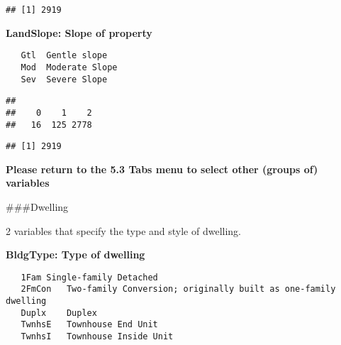 \documentclass[]{article}
\newenvironment{Shaded}{\begin{snugshade}}{\end{snugshade}}
\newcommand{\CommentTok}[1]{\textcolor[rgb]{0.56,0.35,0.01}{\textit{#1}}}
\newcommand{\DecValTok}[1]{\textcolor[rgb]{0.00,0.00,0.81}{#1}}
\newcommand{\KeywordTok}[1]{\textcolor[rgb]{0.13,0.29,0.53}{\textbf{#1}}}
\newcommand{\NormalTok}[1]{#1}
\newcommand{\OperatorTok}[1]{\textcolor[rgb]{0.81,0.36,0.00}{\textbf{#1}}}
\newcommand{\StringTok}[1]{\textcolor[rgb]{0.31,0.60,0.02}{#1}}
\begin{document}
\begin{verbatim}
## [1] 2919
\end{verbatim}

\textbf{LandSlope: Slope of property}

\begin{verbatim}
   Gtl  Gentle slope
   Mod  Moderate Slope  
   Sev  Severe Slope
\end{verbatim}

\begin{Shaded}
\end{Shaded}

\begin{verbatim}
## 
##    0    1    2 
##   16  125 2778
\end{verbatim}

\begin{Shaded}
\end{Shaded}

\begin{verbatim}
## [1] 2919
\end{verbatim}

\textbf{Please return to the 5.3 Tabs menu to select other (groups of)
variables}

\#\#\#Dwelling

2 variables that specify the type and style of dwelling.

\textbf{BldgType: Type of dwelling}

\begin{verbatim}
   1Fam Single-family Detached  
   2FmCon   Two-family Conversion; originally built as one-family dwelling
   Duplx    Duplex
   TwnhsE   Townhouse End Unit
   TwnhsI   Townhouse Inside Unit
\end{verbatim}
\end{document}
